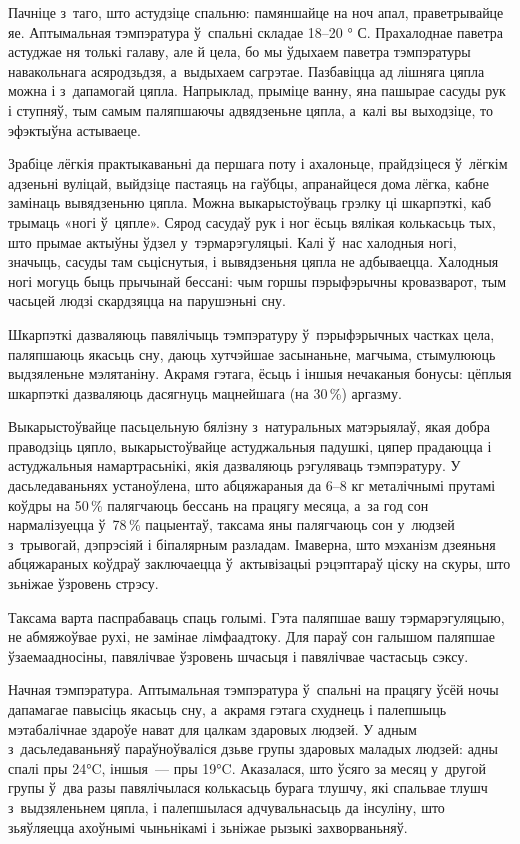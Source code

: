 Пачніце з~таго, што астудзіце спальню: памяншайце на ноч апал, праветрывайце яе. Аптымальная тэмпэратура ў~спальні складае 18--20 ° С. Прахалоднае паветра астуджае ня толькі галаву, але й цела, бо мы ўдыхаем паветра тэмпэратуры навакольнага асяродзьдзя, а~выдыхаем сагрэтае. Пазбавіцца ад лішняга цяпла можна і з~дапамогай цяпла. Напрыклад, прыміце ванну, яна пашырае сасуды рук і ступняў, тым самым паляпшаючы адвядзеньне цяпла, а~калі вы выходзіце, то эфэктыўна астываеце.

Зрабіце лёгкія практыкаваньні да першага поту і ахалоньце, прайдзіцеся ў~лёгкім адзеньні вуліцай, выйдзіце пастаяць на гаўбцы, апранайцеся дома лёгка, кабне замінаць вывядзеньню цяпла. Можна выкарыстоўваць грэлку ці шкарпэткі, каб трымаць «ногі ў~цяпле». Сярод сасудаў рук і ног ёсьць вялікая колькасьць тых, што прымае актыўны ўдзел у~тэрмарэгуляцыі. Калі ў~нас халодныя ногі, значыць, сасуды там сьціснутыя, і вывядзеньня цяпла не адбываецца. Халодныя ногі могуць быць прычынай бессані: чым горшы пэрыфэрычны кровазварот, тым часьцей людзі скардзяцца на парушэньні сну.

Шкарпэткі дазваляюць павялічыць тэмпэратуру ў~пэрыфэрычных частках цела, паляпшаюць якасьць сну, даюць хутчэйшае засынаньне, магчыма, стымулююць выдзяленьне мэлятаніну. Акрамя гэтага, ёсьць і іншыя нечаканыя бонусы: цёплыя шкарпэткі дазваляюць дасягнуць мацнейшага (на 30\,\%) аргазму.

Выкарыстоўвайце пасьцельную бялізну з~натуральных матэрыялаў, якая добра праводзіць цяпло, выкарыстоўвайце астуджальныя падушкі, цяпер прадаюцца і астуджальныя намартрасьнікі, якія дазваляюць рэгуляваць тэмпэратуру. У дасьледаваньнях устаноўлена, што абцяжараныя да 6--8 кг металічнымі прутамі коўдры на 50\,\% палягчаюць бессань на працягу месяца, а~за год сон нармалізуецца ў~78\,\% пацыентаў, таксама яны палягчаюць сон у~людзей з~трывогай, дэпрэсіяй і біпалярным разладам. Імаверна, што мэханізм дзеяньня абцяжараных коўдраў заключаецца ў~актывізацыі рэцэптараў ціску на скуры, што зьніжае ўзровень стрэсу.

Таксама варта паспрабаваць спаць голымі. Гэта паляпшае вашу тэрмарэгуляцыю, не абмяжоўвае рухі, не замінае лімфаадтоку. Для параў сон галышом паляпшае ўзаемаадносіны, павялічвае ўзровень шчасьця і павялічвае частасьць сэксу.

Начная тэмпэратура. Аптымальная тэмпэратура ў~спальні на працягу ўсёй ночы дапамагае павысіць якасьць сну, а~акрамя гэтага схуднець і палепшыць мэтабалічнае здароўе нават для цалкам здаровых людзей. У адным з~дасьледаваньняў параўноўваліся дзьве групы здаровых маладых людзей: адны спалі пры 24°C, іншыя~--- пры 19°C. Аказалася, што ўсяго за месяц у~другой групы ў~два разы павялічылася колькасьць бурага тлушчу, які спальвае тлушч з~выдзяленьнем цяпла, і палепшылася адчувальнасьць да інсуліну, што зьяўляецца ахоўнымі чыньнікамі і зьніжае рызыкі захворваньняў.

